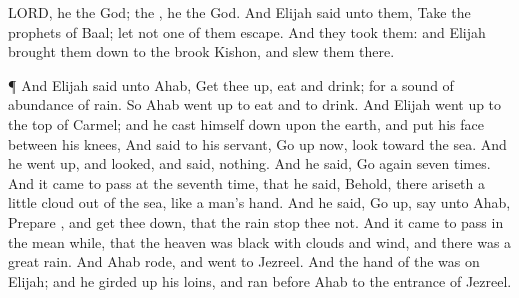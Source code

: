 {{{LORD}}, he
{} the
God; the
{}, he
{} the
God.
And
Elijah
said unto them,
Take the
prophets of
Baal; let not
one of them
escape. And they
took them: and
Elijah brought them
down to the
brook
Kishon, and
slew them there.
\par }{\PP {}¶ And
Elijah
said unto
Ahab, Get thee
up,
eat and
drink; for
{} a
sound of
abundance of
rain.
So
Ahab went
up to
eat and to
drink. And
Elijah went
up to the
top of
Carmel; and he cast himself
down upon the
earth, and
put his
face between his
knees,
And
said to his
servant, Go
up now,
look
toward the
sea. And he went
up, and
looked, and
said,
{}
nothing. And he
said, Go
again
seven
times.
And it came to pass at the seventh
time, that he
said, Behold, there
ariseth a
little
cloud out of the
sea, like a
man’s
hand. And he
said, Go
up,
say unto
Ahab,
Prepare
{}, and get thee
down, that the
rain
stop thee not.
And it came to pass in the mean
while, that the
heaven was
black with
clouds and
wind, and there was a
great
rain. And
Ahab
rode, and
went to
Jezreel.
And the
hand of the
{} was on
Elijah; and he girded
up his
loins, and
ran
before
Ahab to the
entrance of
Jezreel.

}
